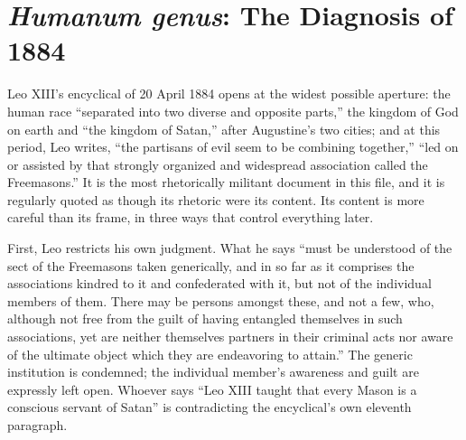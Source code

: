 \section{\emph{Humanum genus}: The Diagnosis of 1884}

Leo XIII's encyclical of 20 April 1884 opens at the widest possible aperture: the human race ``separated into two diverse and opposite parts,'' the kingdom of God on earth and ``the kingdom of Satan,'' after Augustine's two cities; and at this period, Leo writes, ``the partisans of evil seem to be combining together,'' ``led on or assisted by that strongly organized and widespread association called the Freemasons.'' It is the most rhetorically militant document in this file, and it is regularly quoted as though its rhetoric were its content. Its content is more careful than its frame, in three ways that control everything later.

First, Leo restricts his own judgment. What he says ``must be understood of the sect of the Freemasons taken generically, and in so far as it comprises the associations kindred to it and confederated with it, but not of the individual members of them. There may be persons amongst these, and not a few, who, although not free from the guilt of having entangled themselves in such associations, yet are neither themselves partners in their criminal acts nor aware of the ultimate object which they are endeavoring to attain.'' The generic institution is condemned; the individual member's awareness and guilt are expressly left open. Whoever says ``Leo XIII taught that every Mason is a conscious servant of Satan'' is contradicting the encyclical's own eleventh paragraph.

